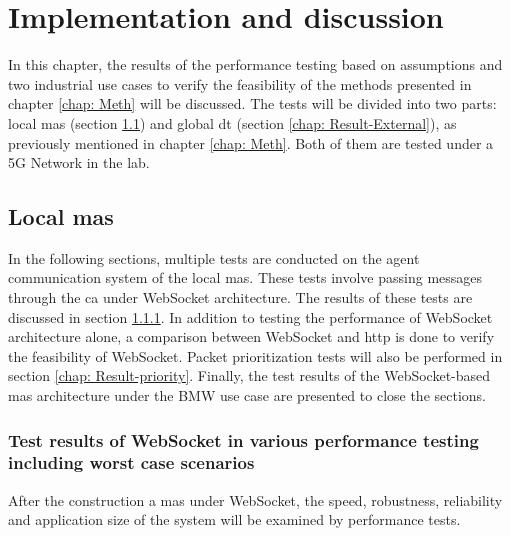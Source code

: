 \chapter{Implementation and discussion} \label{chap: Result}

In this chapter, the results of the performance testing based on assumptions 
and two industrial use cases to verify the feasibility of the methods presented 
in chapter \ref{chap: Meth} will be discussed. The tests will be divided into 
two parts: local \gls{mas} (section \ref{chap: Result-Internal}) and 
global \gls{dt} (section \ref{chap: Result-External}), as previously mentioned in 
chapter \ref{chap: Meth}. Both of them are tested under a 5G Network in the lab.



\section{Local \gls{mas}}\label{chap: Result-Internal}
In the following sections, multiple tests are conducted on the agent communication system 
of the local \gls{mas}. These tests involve passing messages through the \gls{ca} under 
WebSocket architecture. The results of these tests are discussed in 
section \ref{chap: Result-WS}. In addition to testing the performance of WebSocket 
architecture alone, a comparison between WebSocket and \gls{http} is done to verify 
the feasibility of WebSocket. Packet prioritization tests will also be performed in 
section \ref{chap: Result-priority}. Finally, the test results of the 
WebSocket-based \gls{mas} architecture under the BMW use case are presented to 
close the sections.


\subsection{Test results of WebSocket in various performance testing including worst case scenarios} \label{chap: Result-WS}

After the construction a \gls{mas} under WebSocket, the speed, robustness, 
reliability and application size of the system will be examined by 
performance tests. 

